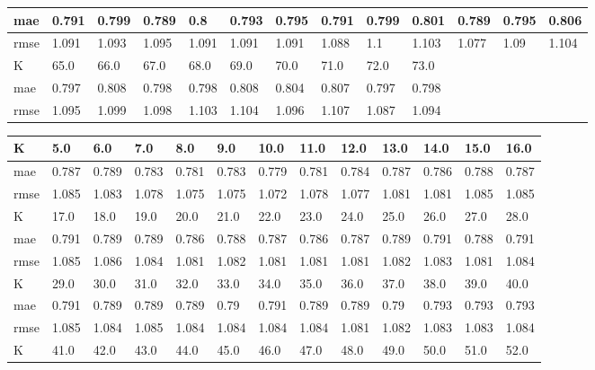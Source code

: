 \begin{appendices}
\begin{center}
\begin{tabularx}{\textwidth}{|l|X|X|X|X|X|X|X|X|X|X|X|X|}
		mae & 0.791 & 0.799 & 0.789 & 0.8 & 0.793 & 0.795 & 0.791 & 0.799 & 0.801 & 0.789 & 0.795 & 0.806 \\ \hline 
		rmse & 1.091 & 1.093 & 1.095 & 1.091 & 1.091 & 1.091 & 1.088 & 1.1 & 1.103 & 1.077 & 1.09 & 1.104 \\ \hline 
		\hline 
		K & 65.0 & 66.0 & 67.0 & 68.0 & 69.0 & 70.0 & 71.0 & 72.0 & 73.0  & & &  \\ \hline 
		mae & 0.797 & 0.808 & 0.798 & 0.798 & 0.808 & 0.804 & 0.807 & 0.797 & 0.798 & & &  \\ \hline 
		rmse & 1.095 & 1.099 & 1.098 & 1.103 & 1.104 & 1.096 & 1.107 & 1.087 & 1.094  & & & \\ \hline 
	\end{tabularx} 
\end{center}
\begin{center} 
	\begin{tabularx}{\textwidth}{|l|X|X|X|X|X|X|X|X|X|X|X|X|} 
		\hline 
		K & 5.0 & 6.0 & 7.0 & 8.0 & 9.0 & 10.0 & 11.0 & 12.0 & 13.0 & 14.0 & 15.0 & 16.0 \\ \hline 
		mae & 0.787 & 0.789 & 0.783 & 0.781 & 0.783 & 0.779 & 0.781 & 0.784 & 0.787 & 0.786 & 0.788 & 0.787 \\ \hline 
		rmse & 1.085 & 1.083 & 1.078 & 1.075 & 1.075 & 1.072 & 1.078 & 1.077 & 1.081 & 1.081 & 1.085 & 1.085 \\ \hline 
		\hline 
		K & 17.0 & 18.0 & 19.0 & 20.0 & 21.0 & 22.0 & 23.0 & 24.0 & 25.0 & 26.0 & 27.0 & 28.0 \\ \hline 
		mae & 0.791 & 0.789 & 0.789 & 0.786 & 0.788 & 0.787 & 0.786 & 0.787 & 0.789 & 0.791 & 0.788 & 0.791 \\ \hline 
		rmse & 1.085 & 1.086 & 1.084 & 1.081 & 1.082 & 1.081 & 1.081 & 1.081 & 1.082 & 1.083 & 1.081 & 1.084 \\ \hline 
		\hline 
		K & 29.0 & 30.0 & 31.0 & 32.0 & 33.0 & 34.0 & 35.0 & 36.0 & 37.0 & 38.0 & 39.0 & 40.0 \\ \hline 
		mae & 0.791 & 0.789 & 0.789 & 0.789 & 0.79 & 0.791 & 0.789 & 0.789 & 0.79 & 0.793 & 0.793 & 0.793 \\ \hline 
		rmse & 1.085 & 1.084 & 1.085 & 1.084 & 1.084 & 1.084 & 1.084 & 1.081 & 1.082 & 1.083 & 1.083 & 1.084 \\ \hline 
		\hline 
		K & 41.0 & 42.0 & 43.0 & 44.0 & 45.0 & 46.0 & 47.0 & 48.0 & 49.0 & 50.0 & 51.0 & 52.0 \\ \hline 

\end{tabularx}
\end{center}
\end{appendices}
